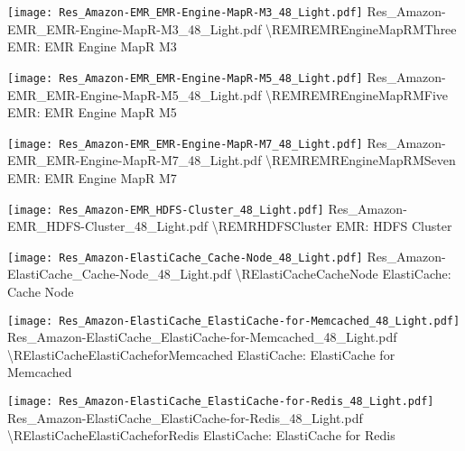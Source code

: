  {\texttt{[image: Res\_Amazon-EMR\_EMR-Engine-MapR-M3\_48\_Light.pdf]}} {Res\_Amazon-EMR\_EMR-Engine-MapR-M3\_48\_Light.pdf} {{\textbackslash}REMREMREngineMapRMThree} {EMR: EMR Engine MapR M3}

 {\texttt{[image: Res\_Amazon-EMR\_EMR-Engine-MapR-M5\_48\_Light.pdf]}} {Res\_Amazon-EMR\_EMR-Engine-MapR-M5\_48\_Light.pdf} {{\textbackslash}REMREMREngineMapRMFive} {EMR: EMR Engine MapR M5}

 {\texttt{[image: Res\_Amazon-EMR\_EMR-Engine-MapR-M7\_48\_Light.pdf]}} {Res\_Amazon-EMR\_EMR-Engine-MapR-M7\_48\_Light.pdf} {{\textbackslash}REMREMREngineMapRMSeven} {EMR: EMR Engine MapR M7}

 {\texttt{[image: Res\_Amazon-EMR\_HDFS-Cluster\_48\_Light.pdf]}} {Res\_Amazon-EMR\_HDFS-Cluster\_48\_Light.pdf} {{\textbackslash}REMRHDFSCluster} {EMR: HDFS Cluster}

 {\texttt{[image: Res\_Amazon-ElastiCache\_Cache-Node\_48\_Light.pdf]}} {Res\_Amazon-ElastiCache\_Cache-Node\_48\_Light.pdf} {{\textbackslash}RElastiCacheCacheNode} {ElastiCache: Cache Node}

 {\texttt{[image: Res\_Amazon-ElastiCache\_ElastiCache-for-Memcached\_48\_Light.pdf]}} {Res\_Amazon-ElastiCache\_ElastiCache-for-Memcached\_48\_Light.pdf} {{\textbackslash}RElastiCacheElastiCacheforMemcached} {ElastiCache: ElastiCache for Memcached}

 {\texttt{[image: Res\_Amazon-ElastiCache\_ElastiCache-for-Redis\_48\_Light.pdf]}} {Res\_Amazon-ElastiCache\_ElastiCache-for-Redis\_48\_Light.pdf} {{\textbackslash}RElastiCacheElastiCacheforRedis} {ElastiCache: ElastiCache for Redis}

